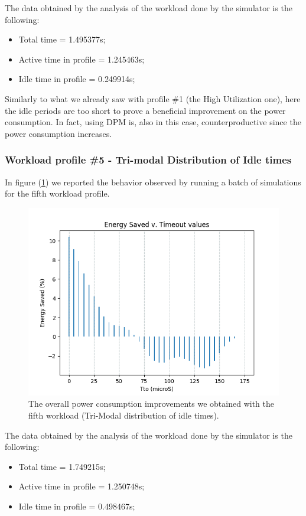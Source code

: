 \documentclass[a4paper]{article}
\begin{document}
            The data obtained by the analysis of the workload done by the simulator is the following:
            \begin{itemize}
                \item Total time = 1.495377s;
                \item Active time in profile = 1.245463s;
                \item Idle time in profile = 0.249914s;
            \end{itemize}

            Similarly to what we already saw with profile \#1 (the High Utilization one), here the idle periods are too short to prove a beneficial improvement on the power consumption. In fact, using DPM is, also in this case, counterproductive since the power consumption increases.

        \subsubsection{Workload profile \#5 - Tri-modal Distribution of Idle times}
            In figure (\ref{fig:Idle_case5}) we reported the behavior observed by running a batch of simulations for the fifth workload profile.

            \begin{figure}[htp]
                \centering
                \includegraphics[width=0.6 \columnwidth]{./screenshots/Idle_case5.png}
                \caption{
                        \label{fig:Idle_case5}
                        The overall power consumption improvements we obtained with the fifth workload (Tri-Modal distribution of idle times).
                }
            \end{figure}

            The data obtained by the analysis of the workload done by the simulator is the following:
            \begin{itemize}
                \item Total time = 1.749215s;
                \item Active time in profile = 1.250748s;
                \item Idle time in profile = 0.498467s;
            \end{itemize}
\end{document}
